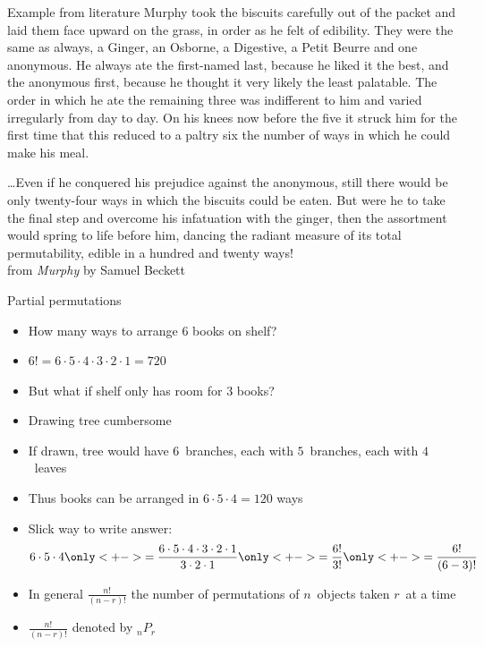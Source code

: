 \documentclass[handout]{beamer}
\theoremstyle{definition}
\begin{document}
\begin{frame}{Example from literature}
Murphy took the biscuits carefully out of the packet and laid them face
upward on the grass, in order as he felt of edibility. They were
the same as always, a Ginger, an Osborne, a Digestive, a Petit
Beurre and one anonymous. He always ate the first-named last, because
he liked it the best, and the anonymous first, because he thought
it very likely the least palatable. The order in which he ate the
remaining three was indifferent to him and varied irregularly from
day to day. On his knees now before the five it struck him for the
first time that this reduced to a paltry six the number of ways in
which he could make his meal.
\end{frame}
\begin{frame}
\dots Even if he conquered his
prejudice against the anonymous, still there would be only twenty-four
ways in which the biscuits could be eaten. But were he to take the
final step and overcome his infatuation with the ginger, then the
assortment would spring to life before him, dancing the radiant
measure of its total permutability, edible in a hundred and twenty
ways!\\
\hfill
from {\em Murphy} by Samuel Beckett
\end{frame}

\begin{frame}{Partial permutations}
\begin{itemize}
\item How many ways to arrange $6$ books on shelf?
\item $6!=6\cdot 5\cdot 4\cdot 3\cdot 2\cdot 1=720$
\item But what if shelf only has room for $3$ books?
\item Drawing tree cumbersome
\item If drawn, tree would have $6$~branches,
each with $5$~branches, each with $4$~leaves
\item Thus books can be arranged in $6\cdot 5\cdot 4=120$ ways
\item Slick way to write answer:
\[6\cdot 5\cdot 4
\only<+->{=\frac{6\cdot 5\cdot 4\cdot 3\cdot 2\cdot 1}
{3\cdot 2\cdot 1}}\only<+->{=\frac{6!}{3!}}
\only<+->{=\frac{6!}{\left(6-3\right)!}}\]
\item In general
$\frac{n!}{\left(n-r\right)!}$ the number of \alert{permutations
of $n$~objects taken $r$~at a time}
\item $\frac{n!}{\left(n-r\right)!}$ denoted
by $_nP_r$
\end{itemize}
\end{frame}
\end{document}
